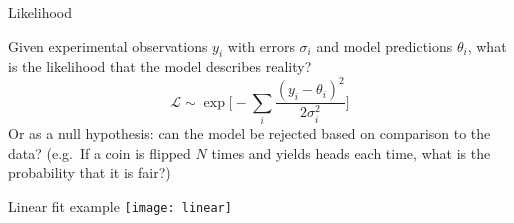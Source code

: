 \documentclass{beamer}
\begin{document}
\begin{frame}[label=likelihood]{Likelihood}
  \vspace{1em}

  Given experimental observations $y_i$ with errors $\sigma_i$ and model predictions $\theta_i$, what is the likelihood that the model
  describes reality?
  \begin{equation*}
    \mathcal L \sim \exp \biggl[ -\sum_i \frac{(y_i-\theta_i)^2}{2\sigma_i^2} \biggr] 
  \end{equation*}
  Or as a null hypothesis:  can the model be rejected based on comparison to the data?  (e.g.\ If a coin is flipped $N$ times and yields
  heads each time, what is the probability that it is fair?)

  \vspace{1em}

  \centering

\end{frame}




\begin{frame}[label=linear]{Linear fit example}
  \vspace{3mm}
  \texttt{[image: linear]}

\end{frame}
\end{document}
